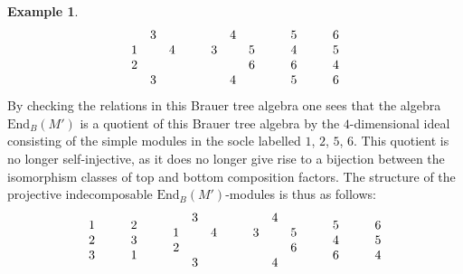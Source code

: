 \documentclass{amsart}
\theoremstyle{plain}\newtheorem{Theorem}{Theorem}[section]
\theoremstyle{plain}\newtheorem{Conjecture}[Theorem]{Conjecture}
\theoremstyle{plain}\newtheorem{Corollary}[Theorem]{Corollary}
\theoremstyle{plain}\newtheorem{Lemma}[Theorem]{Lemma}
\theoremstyle{plain}\newtheorem{Proposition}[Theorem]{Proposition}
\theoremstyle{definition}\newtheorem{Definition}[Theorem]{Definition}
\theoremstyle{definition}\newtheorem{Example}[Theorem]{Example}
\theoremstyle{definition}\newtheorem{Examples}[Theorem]{Examples}
\theoremstyle{definition}\newtheorem{Exercise}[Theorem]{Exercise}
\theoremstyle{definition}\newtheorem{Notation}[Theorem]{Notation}
\theoremstyle{definition}\newtheorem{Remark}[Theorem]{Remark}
\theoremstyle{definition}\newtheorem{Remarks}[Theorem]{Remarks}
\theoremstyle{plain}\newtheorem{Statement}[Theorem]{}
\def\End{\mathrm{End}}
\begin{document}
\begin{Example}
$$  \begin{matrix} & 3 & \\ 1 & & 4 \\ 2 & & \\ & 3 & \end{matrix} \hskip1cm
   \begin{matrix} & 4 & \\ 3 & & 5 \\  & & 6 \\ & 4 & \end{matrix} \hskip1cm
   \begin{matrix} 5 \\ 4 \\ 6 \\ 5 \end{matrix} \hskip1cm
    \begin{matrix} 6 \\ 5 \\ 4 \\ 6 \end{matrix} 
 $$
 By checking the relations in this Brauer tree algebra one sees that the algebra
 $\End_{B}(M')$ is a quotient of this Brauer tree algebra by the $4$-dimensional
 ideal consisting of the simple modules in the socle labelled $1$, $2$, $5$, $6$.
 This quotient is no longer  self-injective, as it does no longer give rise to 
 a bijection between the isomorphism classes of top and bottom composition
 factors. The structure of the projective indecomposable $\End_{B}(M')$-modules
 is thus as follows:
 $$
 \begin{matrix} 1 \\ 2 \\ 3 \end{matrix} \hskip1cm
  \begin{matrix} 2 \\ 3 \\ 1  \end{matrix} \hskip1cm
  \begin{matrix} & 3 & \\ 1 & & 4 \\ 2 & & \\ & 3 & \end{matrix} \hskip1cm
   \begin{matrix} & 4 & \\ 3 & & 5 \\  & & 6 \\ & 4 & \end{matrix} \hskip1cm
   \begin{matrix} 5 \\ 4 \\ 6  \end{matrix} \hskip1cm
    \begin{matrix} 6 \\ 5 \\ 4  \end{matrix} 
 $$
 
\end{Example}
\end{document}
